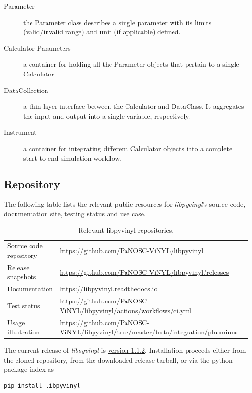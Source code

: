 \documentclass[11pt, a4paper]{article}
\begin{document}
\begin{description}
\item[Parameter] the Parameter class describes a single parameter with its limits (valid/invalid range) and unit (if applicable) defined.
\item[Calculator Parameters] a container for holding all the Parameter objects that pertain to a single Calculator.
\item[DataCollection] a thin layer interface between the Calculator and DataClass. It aggregates the input and output into a single variable, respectively.
\item[Instrument] a container for integrating different Calculator objects into a complete start-to-end simulation workflow.
\end{description}


\subsection{Repository}
\label{sec:lpv_repo}

The following table lists the relevant public resources for
\textit{libpyvinyl}'s source code, documentation site, testing status and use case.
\begin{table}[ht]
  \label{tab:lpv_repos}
  \centering
  \begin{center}
    \caption{Relevant libpyvinyl repositories.}
    \begin{tabular}{l p{10cm}l}
      \hline
      Source code repository & \url{https://github.com/PaNOSC-ViNYL/libpyvinyl} \\
      Release snapshots & \url{https://github.com/PaNOSC-ViNYL/libpyvinyl/releases}\\
      Documentation & \url{https://libpyvinyl.readthedocs.io}\\
      Test status  & \url{https://github.com/PaNOSC-ViNYL/libpyvinyl/actions/workflows/ci.yml}\\
      Usage illustration & \url{https://github.com/PaNOSC-ViNYL/libpyvinyl/tree/master/tests/integration/plusminus}\\
      \hline
    \end{tabular}
  \end{center}
\end{table}

The current release of \textit{libpyvinyl} is
\href{https://github.com/PaNOSC-ViNYL/libpyvinyl/releases/tag/v1.1.2}{version
  1.1.2}. Installation proceeds either from the cloned repository, from the
downloaded release tarball, or via the python package index as
\begin{lstlisting}[language=Python]
pip install libpyvinyl
\end{lstlisting}
\end{document}
